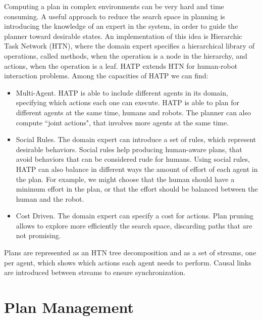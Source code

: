Computing a plan in complex environments can be very hard and time consuming. A useful approach to reduce the search space in planning is introducing the knowledge of an expert in the system, in order to guide the planner toward desirable states. An implementation of this idea is Hierarchic Task Network (HTN), where the domain expert specifies a hierarchical library of operations, called methods, when the operation is a node in the hierarchy, and actions, when the operation is a leaf. HATP extends HTN for human-robot interaction problems. Among the capacities of HATP we can find:
\begin{itemize}
\item Multi-Agent. HATP is able to include different agents in its domain, specifying which actions each one can execute. HATP is able to plan for different agents at the same time, humans and robots. The planner can also compute ``joint actions", that involves more agents at the same time.
\item Social Rules. The domain expert can introduce a set of rules, which represent desirable behaviors. Social rules help producing human-aware plans, that avoid behaviors that can be considered rude for humans. Using social rules, HATP can also balance in different ways the amount of effort of each agent in the plan. For example, we might choose that the human should have a minimum effort in the plan, or that the effort should be balanced between the human and the robot.
\item Cost Driven. The domain expert can specify a cost for actions. Plan pruning allows to explore more efficiently the search space, discarding paths that are not promising.
\end{itemize} 

Plans are represented as an HTN tree decomposition and as a set of streams, one per agent, which shows which actions each agent needs to perform. Causal links are introduced between streams to ensure synchronization.

\section{Plan Management}
\label{sec:plan_management-plan_manager}

